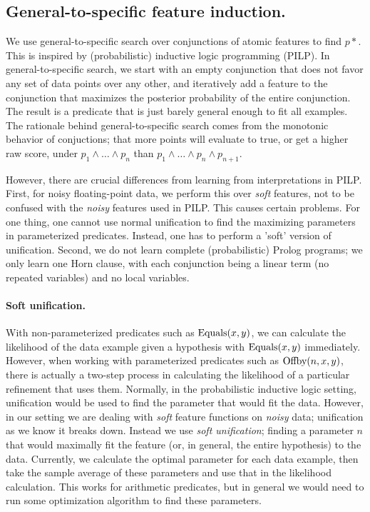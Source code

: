 \documentclass{acmsiggraph}
\begin{document}
\subsection{General-to-specific feature induction.}

We use general-to-specific search over conjunctions of atomic features to find $p*$.
This is inspired by (probabilistic) inductive logic programming (PILP).
In general-to-specific search, we start with an empty conjunction that does not
favor any set of data points over any other, and iteratively add a feature to
the conjunction that maximizes the posterior probability of the entire conjunction.
The result is a predicate that is just barely general enough to fit all examples.
The rationale behind general-to-specific search comes from the monotonic behavior of conjuctions;
that more points will evaluate to true, or get a higher raw score, under $p_1
\wedge \ldots \wedge p_n$ than $p_1 \wedge \ldots \wedge p_n \wedge p_{n + 1}$.

However, there are crucial differences from learning from interpretations in PILP.
First, for noisy floating-point data, we perform this over \emph{soft} features,
not to be confused with the \emph{noisy} features used in PILP.
This causes certain problems. For one thing, one cannot use normal unification
to find the maximizing parameters in parameterized predicates.
Instead, one has to perform a 'soft' version of unification.
Second, we do not learn complete (probabilistic) Prolog programs;
we only learn one Horn clause,
with each conjunction being a linear term (no repeated variables)
and no local variables.

\lstset{language=LISP}


\paragraph{Soft unification.}

With non-parameterized predicates
such as $\textup{Equals}(x, y)$,
we can calculate the likelihood of the data example
given a hypothesis with $\textup{Equals}(x, y)$ immediately.
However, when working with parameterized predicates
such as $\textup{Offby}(n, x, y)$, there is actually a two-step process
in calculating the likelihood of a particular refinement
that uses them. 
Normally, in the probabilistic inductive logic setting,
unification would be used to find the parameter that would fit the data.
However, in our setting we are dealing with \emph{soft}
feature functions on \emph{noisy} data;
unification as we know it breaks down.
Instead we use \emph{soft unification};
finding a parameter $n$ that would maximally fit
the feature (or, in general, the entire hypothesis) to the data.
Currently, we calculate the optimal parameter
for each data example, then take the sample average of these parameters
and use that in the likelihood calculation.
This works for arithmetic predicates,
but in general we would need to run some optimization algorithm
to find these parameters.
\end{document}
